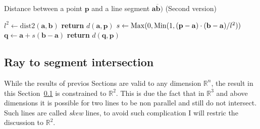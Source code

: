 {\centering
\begin{minipage}{\linewidth}
  \begin{algorithm}[H]
    \caption{Distance between a point $\mathbf{p}$ and a line segment $\overline{\mathbf{a}\mathbf{b})}$  (Second version)}
    \label{alg:poin2seg2}
    \begin{algorithmic}[1] %
       
        \State $l^2 \gets \text{dist2}(\mathbf{a},\mathbf{b})$
         
          \State \textbf{return} $d(\mathbf{a},\mathbf{p})$
        \EndIf
        \State $s \gets \operatorname{Max}(0, \operatorname{Min}(1, (\mathbf{p}-\mathbf{a})\cdot(\mathbf{b}-\mathbf{a}) / l^2))$ 
        \State $\mathbf{q} \gets \mathbf{a} + s (\mathbf{b} - \mathbf{a})$
        \State \textbf{return} $d(\mathbf{q},\mathbf{p})$
      \EndProcedure
    \end{algorithmic}
  \end{algorithm}
\end{minipage}
\par
}

{\centering
\begin{minipage}{\linewidth}
\end{minipage}
\par
}

\subsection{Ray to segment intersection}
\label{sec:ray2segment}
While the results of previos Sections are valid to any dimension $\mathbb{R}^n$, the result in this Section~\ref{sec:ray2segment} is constrained to $\mathbb{R}^2$.
This is due the fact that in $\mathbb{R}^3$ and above dimensions it is possible for two lines to be non parallel and still do not intersect.
Such lines are called \emph{skew} lines, to avoid such complication I will restric the discussion to $\mathbb{R}^2$.

